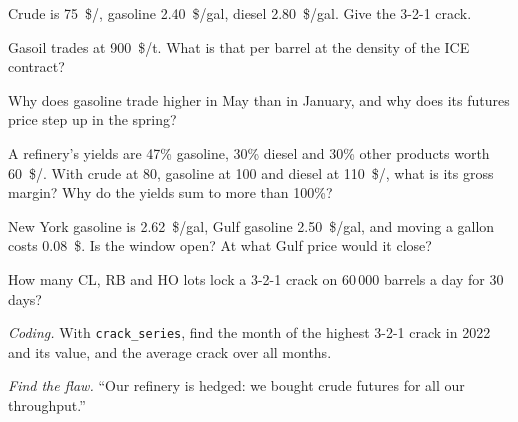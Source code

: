 \begin{exercise}[$\star$]\label{exo:m3:refined-products-and-cracks:1}
Crude is \qty{75}{\$/\barrel}, gasoline \qty{2.40}{\$/gal}, diesel \qty{2.80}{\$/gal}. Give
the 3-2-1 crack.
\end{exercise}

\begin{exercise}[$\star$]\label{exo:m3:refined-products-and-cracks:2}
Gasoil trades at \qty{900}{\$/t}. What is that per barrel at the density of the ICE
contract?
\end{exercise}

\begin{exercise}[$\star$]\label{exo:m3:refined-products-and-cracks:3}
Why does gasoline trade higher in May than in January, and why does its futures price
step up in the spring?
\end{exercise}

\begin{exercise}[$\star\star$]\label{exo:m3:refined-products-and-cracks:4}
A refinery's yields are 47\% gasoline, 30\% diesel and 30\% other products worth
\qty{60}{\$/\barrel}. With crude at \qty{80}{}, gasoline at \qty{100}{} and diesel at
\qty{110}{\$/\barrel}, what is its gross margin? Why do the yields sum to more than 100\%?
\end{exercise}

\begin{exercise}[$\star\star$]\label{exo:m3:refined-products-and-cracks:5}
New York gasoline is \qty{2.62}{\$/gal}, Gulf gasoline \qty{2.50}{\$/gal}, and moving a
gallon costs \qty{0.08}{\$}. Is the window open? At what Gulf price would it close?
\end{exercise}

\begin{exercise}[$\star\star$]\label{exo:m3:refined-products-and-cracks:6}
How many CL, RB and HO lots lock a 3-2-1 crack on 60\,000 barrels a day for 30 days?
\end{exercise}

\begin{exercise}[$\star\star\star$]\label{exo:m3:refined-products-and-cracks:7}
\emph{Coding.} With \texttt{crack\_series}, find the month of the highest 3-2-1 crack in
2022 and its value, and the average crack over all months.
\end{exercise}

\begin{exercise}[$\star\star\star$]\label{exo:m3:refined-products-and-cracks:8}
\emph{Find the flaw.} ``Our refinery is hedged: we bought crude futures for all our
throughput.''
\end{exercise}

